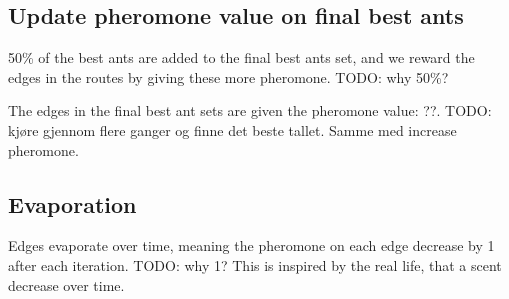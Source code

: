 \subsection{Update pheromone value on final best ants}

\begin{algorithm}[H]
\end{algorithm}

50\% of the best ants are added to the final best ants set, and we reward the edges in the routes by giving these more pheromone.
TODO: why 50\%?

The edges in the final best ant sets are given the pheromone value: ??. TODO: kjøre gjennom flere ganger og finne det beste tallet. Samme med increase pheromone.


\subsection{Evaporation}

\begin{algorithm}[H]
\end{algorithm}

Edges evaporate over time, meaning the pheromone on each edge decrease by 1 after each iteration. TODO: why 1?
This is inspired by the real life, that a scent decrease over time.





